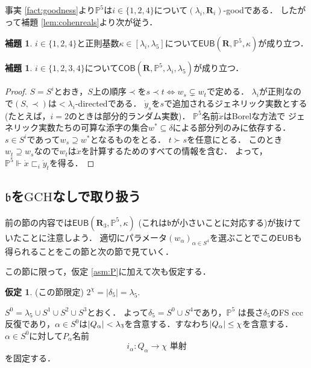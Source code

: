 \documentclass[uplatex,dvipdfmx]{jsarticle}
\newcommand\forces{\Vdash}
\newcommand{\frakb}{\mathfrak{b}}
\newcommand{\GCH}{\mathrm{GCH}}
\newcommand{\EUB}{\mathsf{EUB}}
\newcommand{\COB}{\mathsf{COB}}
\newcommand{\relR}{\mathbf{R}}
\newcommand{\Pa}{\mathbb{P}^5}
\DeclarePairedDelimiter\abs{\lvert}{\rvert}
\theoremstyle{definition}
\newtheorem{lem}[thm]{補題}
\newtheorem{assumption}[thm]{仮定}
\begin{document}
	事実 \ref{fact:goodness}より$\Pa$は$i\in\{1,2,4\}$について$(\lambda_i, \relR_i)$-goodである．
	したがって補題 \ref{lem:cohenreals}より次が従う．

	\begin{lem}
		$i \in \{1,2,4\}$と正則基数$\kappa \in [\lambda_i, \lambda_5]$について$\EUB(\relR, \Pa, \kappa)$が成り立つ．
	\end{lem}

	\begin{lem}
		$i \in \{1,2,3,4\}$について$\COB(\relR, \Pa, \lambda_i, \lambda_5)$が成り立つ．
	\end{lem}
	\begin{proof}
		$S=S^i$とおき，$S$上の順序$\prec$を$s\prec t \iff w_s\subsetneq w_t$で定める．
		$\lambda_i$が正則なので$(S,\prec)$は${<}\lambda_i$-directedである．
		$\dot{y}_s$を$s$で追加されるジェネリック実数とする (たとえば，$i=2$のときは部分的ランダム実数)．
		$\Pa$名前$\dot{x}$はBorelな方法で 
		ジェネリック実数たちの可算な添字の集合$w^*\subseteq \delta$による部分列のみに依存する．
		$s\in S^i$であって$w_s\supseteq w^*$となるものをとる．
		$t\succ s$を任意にとる．
		このとき$w_t\supseteq w_s$なので$w_t$は$\dot{x}$を計算するためのすべての情報を含む．
		よって，$\Pa \forces \dot{x} \sqsubset_i \dot{y}_t$を得る．
	\end{proof}
	
	\subsection{$\frakb$を$\GCH$なしで取り扱う}
	
	前の節の内容では$\EUB(\relR_3, \Pa, \kappa)$ (これは$\frakb$が小さいことに対応する)が抜けていたことに注意しよう．
	適切にパラメータ$(w_\alpha)_{\alpha \in S^4}$を選ぶことでこの$\EUB$も得られることをこの節と次の節で見ていく．
	
	この節に限って，仮定 \ref{asm:P}に加えて次も仮定する．
	
	\begin{assumption}\label{asm:chi}
		(この節限定) $2^\chi =|\delta_5|= \lambda_5$.
	\end{assumption}
	
	$S^0=\lambda_5\cup S^1\cup S^2\cup S^3$とおく．
	よって$\delta_5=S^0\cup S^4$であり，$\Pa$ は長さ$\delta_5$のFS ccc反復であり，$\alpha\in S^0$は$\abs{Q_\alpha}<\lambda_3$を含意する．すなわち$\abs{Q_\alpha}\le\chi$を含意する．
	$\alpha \in S^0$に対して$P_\alpha$名前
	\begin{equation}\label{eq:ia}
		i_\alpha:Q_\alpha\to\chi\text{ 単射}
	\end{equation}
	を固定する．
	
\end{document}
